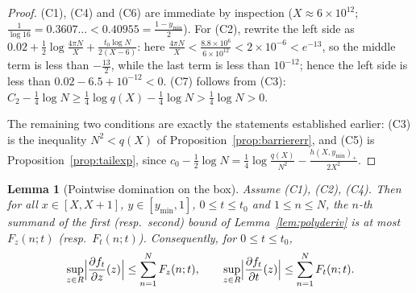 \documentclass[11pt]{article}
\newtheorem{lemma}[theorem]{Lemma}
\theoremstyle{definition}
\begin{document}
\begin{proof}
(C1), (C4) and (C6) are immediate by inspection
($X\approx6\times10^{12}$;
$\frac1{\log16}=0.3607\ldots<0.40955=\frac{1-y_{\min}}2$). For
(C2), rewrite the left side as
$0.02+\frac12\log\frac{4\pi N}{X}
+\frac{t_0\log N}{2(X-6)}$: here
$\frac{4\pi N}{X}<\frac{8.8\times10^6}{6\times10^{12}}
<2\times10^{-6}<e^{-13}$, so the middle term is less than
$-\frac{13}2$, while the last term is less than $10^{-12}$; hence
the left side is less than $0.02-6.5+10^{-12}<0$. (C7) follows
from (C3): $C_2-\frac14\log N\ge\frac14\log q(X)-\frac14\log N
>\frac14\log N>0$.

The remaining two conditions are exactly the statements
established earlier: (C3) is the inequality $N^2<q(X)$ of
Proposition~\ref{prop:barriererr}, and (C5) is
Proposition~\ref{prop:tailexp}, since
$c_0-\frac12\log N
=\frac14\log\frac{q(X)}{N^2}-\frac{h(X,y_{\min})_+}{2X^2}$.
\end{proof}

\begin{lemma}[Pointwise domination on the box]\label{lem:dompoint}
Assume (C1), (C2), (C4). Then for all $x\in[X,X+1]$,
$y\in[y_{\min},1]$, $0\le t\le t_0$ and $1\le n\le N$, the $n$-th
summand of the first (resp.\ second) bound of
Lemma~\ref{lem:polyderiv} is at most $F_z(n;t)$ (resp.\
$F_t(n;t)$). Consequently, for $0\le t\le t_0$,
\[
\sup_{z\in R}\Bigl|\frac{\partial f_t}{\partial z}(z)\Bigr|
\le\sum_{n=1}^{N}F_z(n;t),
\qquad
\sup_{z\in R}\Bigl|\frac{\partial f_t}{\partial t}(z)\Bigr|
\le\sum_{n=1}^{N}F_t(n;t).
\]
\end{lemma}
\end{document}
